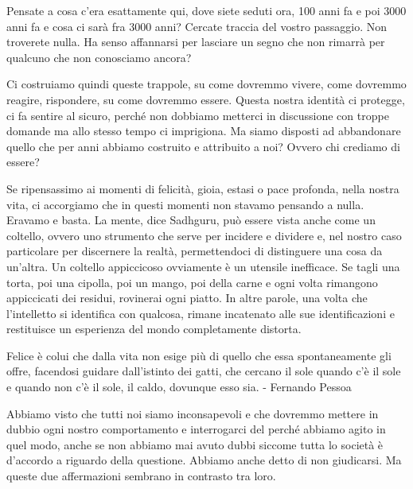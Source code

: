 \documentclass[12pt]{book} %
\begin{document}
\begin{mdframed}[linewidth=1pt]
Pensate a cosa c'era esattamente qui, dove siete seduti ora, 100 anni fa e poi 3000 anni fa e cosa ci sarà fra 3000 anni? Cercate traccia del vostro passaggio. Non troverete nulla. Ha senso affannarsi per lasciare un segno che non rimarrà per qualcuno che non conosciamo ancora?
\end{mdframed}

Ci costruiamo quindi queste trappole, su come dovremmo vivere, come dovremmo reagire, rispondere, su come dovremmo
essere. Questa nostra identità ci protegge, ci fa sentire al sicuro, perché non dobbiamo metterci in discussione con
troppe domande ma allo stesso tempo ci imprigiona. Ma siamo disposti ad abbandonare quello che per anni abbiamo
costruito e attribuito a noi? Ovvero chi crediamo di essere? 

Se ripensassimo ai momenti di felicità, gioia, estasi o pace profonda, nella nostra vita, ci accorgiamo che in questi
momenti non stavamo pensando a nulla. Eravamo e basta. La mente, dice Sadhguru, può essere vista anche come un
coltello, ovvero uno strumento che serve per incidere e dividere e, nel nostro caso particolare per discernere la
realtà, permettendoci di distinguere una cosa da un'altra. Un coltello appiccicoso ovviamente è un utensile inefficace.
Se tagli una torta, poi una cipolla, poi un mango, poi della carne e ogni volta rimangono appiccicati dei residui,
rovinerai ogni piatto. In altre parole, una volta che l'intelletto si identifica con qualcosa, rimane incatenato alle
sue identificazioni e restituisce un esperienza del mondo completamente distorta.

Felice è colui che dalla vita non esige più di quello che essa spontaneamente gli offre, facendosi guidare dall'istinto
dei gatti, che cercano il sole quando c'è il sole e quando non c'è il sole, il caldo, dovunque esso sia. - Fernando
Pessoa

Abbiamo visto che tutti noi siamo inconsapevoli e che dovremmo mettere in dubbio ogni nostro comportamento e
interrogarci del perché abbiamo agito in quel modo, anche se non abbiamo mai avuto dubbi siccome tutta lo società è
d'accordo a riguardo della questione. Abbiamo anche detto di non giudicarsi. Ma queste due
affermazioni sembrano in contrasto tra loro.
\end{document}
